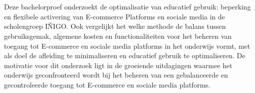 
%
%
%
%
%

%



\chapter*{}

   Deze bachelorproef onderzoekt de optimalisatie van educatief gebruik: beperking en flexibele activering van E-commerce Platforms en sociale media in de scholengroep IÑIGO. Ook vergelijkt het welke methode de balans tussen gebruiksgemak, algemene kosten en functionaliteiten voor het beheren van toegang tot E-commerce en sociale media platforms in het onderwijs vormt, met als doel de afleiding te minimaliseren en educatief gebruik te optimaliseren. De motivatie voor dit onderzoek ligt in de groeiende uitdagingen waarmee het onderwijs geconfronteerd wordt bij het beheren van een gebalanceerde en gecontroleerde toegang tot E-commerce en sociale media platforms.\newline
   
